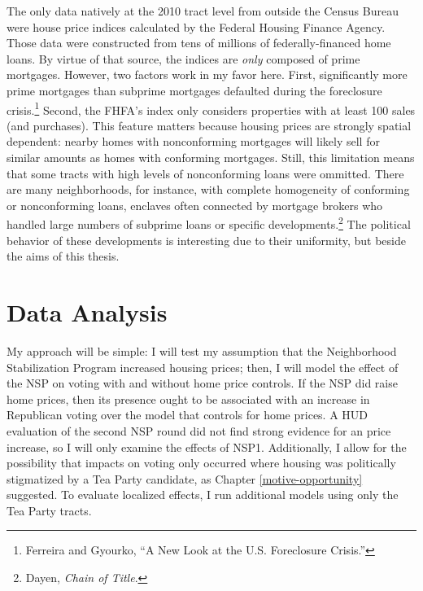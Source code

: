 \documentclass[12pt,oneside]{psthesis}
\begin{document}
The only data natively at the 2010 tract level from outside the Census Bureau were house price indices calculated by the Federal Housing Finance Agency.
Those data were constructed from tens of millions of federally-financed home loans.
By virtue of that source, the indices are \emph{only} composed of prime mortgages.
However, two factors work in my favor here.
First, significantly more prime mortgages than subprime mortgages defaulted during the foreclosure crisis.\footnote{Ferreira and Gyourko, ``A New Look at the U.S. Foreclosure Crisis.''}
Second, the FHFA's index only considers properties with at least 100 sales (and purchases).
This feature matters because housing prices are strongly spatial dependent: nearby homes with nonconforming mortgages will likely sell for similar amounts as homes with conforming mortgages.
Still, this limitation means that some tracts with high levels of nonconforming loans were ommitted.
There are many neighborhoods, for instance, with complete homogeneity of conforming or nonconforming loans, enclaves
often connected by mortgage brokers who handled large numbers of subprime loans or specific developments.\footnote{Dayen, \emph{Chain of Title}.}
The political behavior of these developments is interesting due to their uniformity, but beside the aims of this thesis.

\hypertarget{analysis}{%
\section{Data Analysis}\label{analysis}}

My approach will be simple: I will test my assumption that the Neighborhood Stabilization Program increased housing prices; then, I will model the effect of the NSP on voting with and without home price controls.
If the NSP did raise home prices, then its presence ought to be associated with an increase in Republican voting over the model that controls for home prices.
A HUD evaluation of the second NSP round did not find strong evidence for an price increase, so I will only examine the effects of NSP1.
Additionally, I allow for the possibility that impacts on voting only occurred where housing was politically stigmatized by a Tea Party candidate, as Chapter \ref{motive-opportunity} suggested.
To evaluate localized effects, I run additional models using only the Tea Party tracts.
\end{document}
